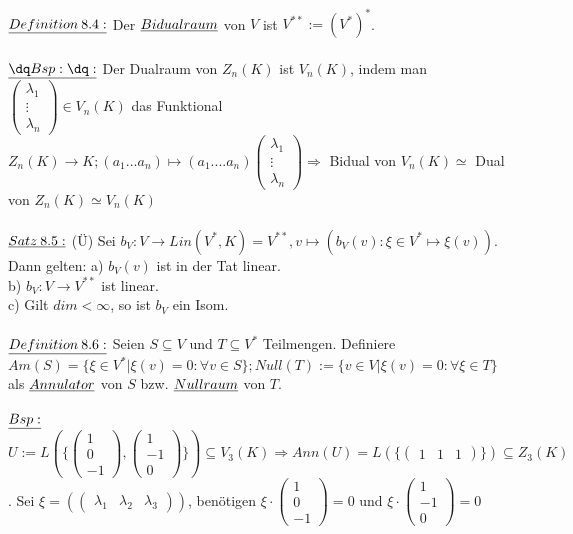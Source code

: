 \documentclass[fleqn, a4paper, 11pt]{scrartcl}
\theoremstyle{definition}
\begin{document}
\\
$\uline{Definition\:8.4:}$ Der $\uline{Bidualraum}$ von $V$ ist $V^{\ast\ast}:=(V^{\ast})^{\ast}$.\\
\\
$\uline{\dq Bsp:\dq:}$ Der Dualraum von $Z_n(K)$ ist $V_n(K)$, indem man $\begin{pmatrix}
	\lambda_1\\
	\vdots\\
	\lambda_n
\end{pmatrix}\in V_n(K)$ das Funktional $Z_n(K)\rightarrow K;(a_1...a_n)\mapsto(a_1....a_n)\begin{pmatrix}
	\lambda_1\\
	\vdots\\
	\lambda_n
\end{pmatrix}\Rightarrow$ Bidual von $V_n(K)\simeq$ Dual von $Z_n(K)\simeq V_n(K)$\\
\\
$\uline{Satz\:8.5:}$ (\"U) Sei $b_V:V\rightarrow Lin(V^{\ast},K)=V^{\ast\ast},v\mapsto(b_V(v):\xi\in V^{\ast}\mapsto \xi(v))$. Dann gelten: a) $b_V(v)$ ist in der Tat linear.\\
b) $b_V:V\rightarrow V^{\ast\ast}$ ist linear.\\
c) Gilt $dim < \infty$, so ist $b_V$ ein Isom.\\
\\
$\uline{Definition\:8.6:}$ Seien $S\subseteq V$ und $T \subseteq V^{\ast}$ Teilmengen. Definiere $Am(S)=\{\xi\in V^{\ast}|\xi(v)=0:\forall v\in S\};Null(T):=\{v\in V|\xi(v)=0:\forall\xi\in T\}$ als $\uline{Annulator}$ von $S$ bzw. $\uline{Nullraum}$ von $T$.\\
\\
$\uline{Bsp:}$ $U:=L(\{\begin{pmatrix}
	1\\
	0\\
	-1
\end{pmatrix},\begin{pmatrix}
	1\\
	-1\\
	0
\end{pmatrix}\})\subseteq V_3(K)\Rightarrow Ann(U)=L(\{\begin{pmatrix} 1&1&1\end{pmatrix}\})\subseteq Z_3(K)$. Sei $\xi=(\begin{pmatrix}\lambda_1&\lambda_2&\lambda_3\end{pmatrix})$, benötigen $\xi\cdot\begin{pmatrix}
	1\\
	0\\
	-1
\end{pmatrix}=0$ und $\xi\cdot\begin{pmatrix}
	1\\
	-1\\
	0
\end{pmatrix}=0$\\
\end{document}
